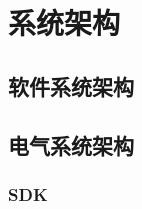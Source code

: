 
\chapter{系统架构}
\label{chap:chapter06}

\section{软件系统架构}
\label{sec:marineradar}

\section{电气系统架构}



\subsection{SDK}
